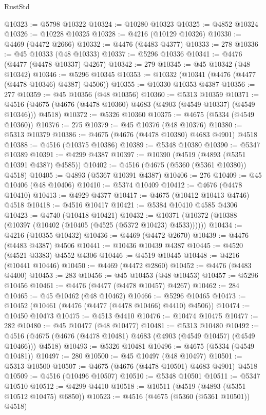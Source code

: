 \begin{lexlean}{RustStd}
\begin{coremodule}
{\begin{coremodule}
{{{{{{{{{{{{{{{{{{{{{{{{{{{{{{{{{{{{{{{{{{{{{{{{{{{{{{{{{{{{@10323 := @5798 @10322
@10324 := @10280 @10323
@10325 := @4852 @10324
@10326 := @10228 @10325
@10328 := @4216 (@10129 @10326)
@10330 := @4469 (@4472 @2666)
@10332 := @4476 (@4483 @4377)
@10333 := 278
@10336 := @45 @10333 (@48 @10333)
@10337 := @5296 @10336
@10341 := @4476 (@4477 (@4478 @10337) @4267)
@10342 := 279
@10345 := @45 @10342 (@48 @10342)
@10346 := @5296 @10345
@10353 := @10332 (@10341 (@4476 (@4477 (@4478 @10346) @4387) @4506))
@10355 := @10330 @10353 @4387
@10356 := 277
@10359 := @45 @10356 (@48 @10356)
@10360 := @5313 @10359
@10371 := @4516 (@4675 (@4676 (@4478 @10360) @4683 (@4903 (@4549 @10337) (@4549 @10346))) @4518)
@10372 := @5326 @10360
@10375 := @4675 (@5334 (@4549 @10360))
@10376 := 275
@10379 := @45 @10376 (@48 @10376)
@10380 := @5313 @10379
@10386 := @4675 (@4676 (@4478 @10380) @4683 @4901) @4518
@10388 := @4516 (@10375 @10386)
@10389 := @5348 @10380
@10390 := @5347 @10389
@10391 := @4299 @4387
@10397 := @10390 (@4519 (@4893 (@5351 @10391 @4387) @4585))
@10402 := @4516 (@4675 (@5360 (@5361 @10380)) @4518)
@10405 := @4893 (@5367 @10391 @4387)
@10406 := 276
@10409 := @45 @10406 (@48 @10406)
@10410 := @5374 @10409
@10412 := @4676 (@4478 @10410)
@10413 := @4929 @4377
@10417 := @4675 (@10412 @10413 @4746) @4518
@10418 := @4516 @10417
@10421 := @5384 @10410 @4585 @4306
@10423 := @4740 (@10418 @10421)
@10432 := @10371 (@10372 (@10388 (@10397 (@10402 (@10405 (@4525 (@5372 @10423) @4533))))))
@10434 := @4216 (@10355 @10432)
@10436 := @4469 (@4472 @2670)
@10439 := @4476 (@4483 @4387) @4506
@10441 := @10436 @10439 @4387
@10445 := @4520 (@4521 @3383) @4552 @4306
@10446 := @4519 @10445
@10448 := @4216 (@10441 @10446)
@10450 := @4469 (@4472 @2860)
@10452 := @4476 (@4483 @4400)
@10453 := 283
@10456 := @45 @10453 (@48 @10453)
@10457 := @5296 @10456
@10461 := @4476 (@4477 (@4478 @10457) @4267)
@10462 := 284
@10465 := @45 @10462 (@48 @10462)
@10466 := @5296 @10465
@10473 := @10452 (@10461 (@4476 (@4477 (@4478 @10466) @4410) @4506))
@10474 := @10450 @10473
@10475 := @4513 @4410
@10476 := @10474 @10475
@10477 := 282
@10480 := @45 @10477 (@48 @10477)
@10481 := @5313 @10480
@10492 := @4516 (@4675 (@4676 (@4478 @10481) @4683 (@4903 (@4549 @10457) (@4549 @10466))) @4518)
@10493 := @5326 @10481
@10496 := @4675 (@5334 (@4549 @10481))
@10497 := 280
@10500 := @45 @10497 (@48 @10497)
@10501 := @5313 @10500
@10507 := @4675 (@4676 (@4478 @10501) @4683 @4901) @4518
@10509 := @4516 (@10496 @10507)
@10510 := @5348 @10501
@10511 := @5347 @10510
@10512 := @4299 @4410
@10518 := @10511 (@4519 (@4893 (@5351 @10512 @10475) @6850))
@10523 := @4516 (@4675 (@5360 (@5361 @10501)) @4518)
}}}}}}}}}}}}}}}}}}}}}}}}}}}}}}}}}}}}}}}}}}}}}}}}}}}}}}}}}}}}
\end{coremodule}}
\end{coremodule}
\end{lexlean}
